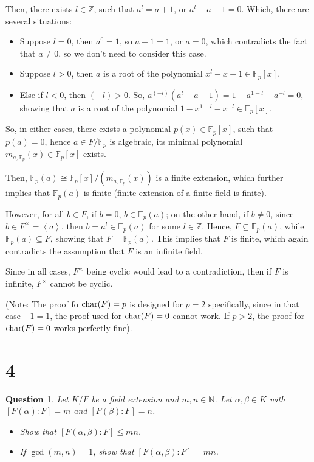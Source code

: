 \documentclass{article}
\newtheorem{question}{Question}
\begin{document}
Then, there exists $l\in\mathbb{Z}$, such that $a^l = a+1$, or $a^l-a-1 =0$. Which, there are several situations:
\begin{itemize}
    \item Suppose $l=0$, then $a^0 = 1$, so $a+1 = 1$, or $a=0$, which contradicts the fact that $a\neq 0$, so we don't need to consider this case.
    \item Suppose $l>0$, then $a$ is a root of the polynomial $x^l-x-1 \in \mathbb{F}_p[x]$.
    \item Else if $l<0$, then $(-l)>0$. So, $a^{(-l)}(a^l-a-1) = 1-a^{1-l}-a^{-l} = 0$, showing that $a$ is a root of the polynomial $1-x^{1-l}-x^{-l}\in\mathbb{F}_p[x]$.
\end{itemize}
So, in either cases, there exists a polynomial $p(x)\in \mathbb{F}_p[x]$, such that $p(a)=0$, hence $a\in F/\mathbb{F}_p$ is algebraic, its minimal polynomial $m_{a,\mathbb{F}_p}(x)\in\mathbb{F}_p[x]$ exists.

Then, $\mathbb{F}_p(a) \cong \mathbb{F}_p[x]/(m_{a,\mathbb{F}_p}(x))$ is a finite extension, which further implies that $\mathbb{F}_p(a)$ is finite (finite extension of a finite field is finite).

However, for all $b\in F$, if $b=0$, $b\in\mathbb{F}_p(a)$; on the other hand, if $b\neq 0$, since $b\in F^\times = \left<a\right>$, then $b=a^l\in\mathbb{F}_p(a)$ for some $l\in\mathbb{Z}$. Hence, $F\subseteq\mathbb{F}_p(a)$, while $\mathbb{F}_p(a)\subseteq F$, showing that $F=\mathbb{F}_p(a)$. This implies that $F$ is finite, which again contradicts the assumption that $F$ is an infinite field.

\hfil

Since in all cases, $F^\times$ being cyclic would lead to a contradiction, then if $F$ is infinite, $F^\times$ cannot be cyclic.

(Note: The proof fo $\textmd{char}(F)=p$ is designed for $p=2$ specifically, since in that case $-1=1$, the proof used for $\textmd{char}(F)=0$ cannot work. If $p>2$, the proof for $\textmd{char}(F)=0$ works perfectly fine).

\break

\section*{4}
\begin{myBox}[]{}
    \begin{question}
        Let $K/F$ be a field extension and $m,n\in\mathbb{N}$. Let $\alpha,\beta\in K$ with $[F(\alpha):F]=m$ and $[F(\beta):F]=n$.
        \begin{itemize}
            \item[(a)] Show that $[F(\alpha,\beta):F]\leq mn$.
            \item[(b)] If $\gcd(m,n)=1$, show that $[F(\alpha,\beta):F]=mn$.
        \end{itemize}
    \end{question}
\end{myBox}
\end{document}
